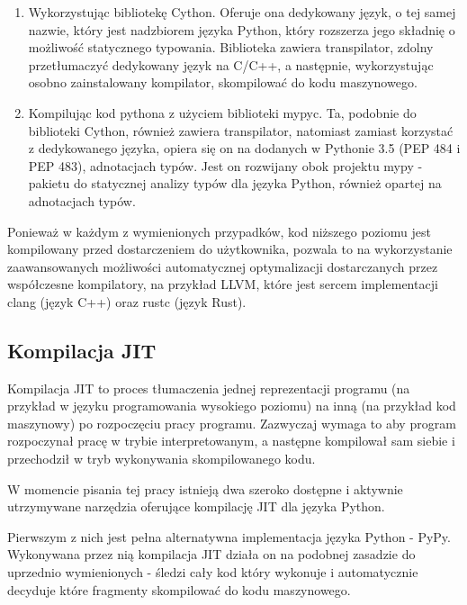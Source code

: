 \documentclass[11pt, a4paper]{article}
\begin{document}
\begin{sloppypar}
\begin{enumerate}
      \item Wykorzystując bibliotekę Cython\cite{Cython_Org}\cite{Cython_The_Best_Of_Both}.
        Oferuje ona dedykowany język, o tej samej nazwie, który jest nadzbiorem języka
        Python, który rozszerza jego składnię o możliwość statycznego typowania.
        Biblioteka zawiera transpilator, zdolny przetłumaczyć dedykowany język na C/C++,
        a następnie, wykorzystując osobno zainstalowany kompilator, skompilować do kodu
        maszynowego.

      \item Kompilując kod pythona z użyciem biblioteki mypyc\cite{mypyc}. Ta, podobnie
        do biblioteki Cython, również zawiera transpilator, natomiast zamiast korzystać
        z dedykowanego języka, opiera się on na dodanych w Pythonie 3.5\cite{Python_3_5}
        (PEP 484\cite{PEP_484} i PEP 483\cite{PEP_483}), adnotacjach typów. Jest on
        rozwijany obok projektu mypy - pakietu do statycznej analizy typów dla języka
        Python, również opartej na adnotacjach typów\cite{mypy}.
    \end{enumerate}

    Ponieważ w każdym z wymienionych przypadków, kod niższego poziomu jest kompilowany przed
    dostarczeniem do użytkownika, pozwala to na wykorzystanie zaawansowanych możliwości
    automatycznej optymalizacji dostarczanych przez współczesne kompilatory, na przykład
    LLVM, które jest sercem implementacji clang (język C++) oraz rustc (język Rust).

    \subsection{Kompilacja JIT}
    Kompilacja JIT to proces tłumaczenia jednej reprezentacji programu (na przykład w języku
    programowania wysokiego poziomu) na inną (na przykład kod maszynowy) po rozpoczęciu
    pracy programu. Zazwyczaj wymaga to aby program rozpoczynał pracę w trybie interpretowanym,
    a następne kompilował sam siebie i przechodził w tryb wykonywania skompilowanego
    kodu.

    W momencie pisania tej pracy istnieją dwa szeroko dostępne i aktywnie utrzymywane
    narzędzia oferujące kompilację JIT dla języka Python.

    Pierwszym z nich jest pełna alternatywna implementacja języka Python - PyPy\cite{PyPy_Home_Page}.
    Wykonywana przez nią kompilacja JIT działa on na podobnej zasadzie do uprzednio
    wymienionych - śledzi cały kod który wykonuje i automatycznie decyduje które
    fragmenty skompilować do kodu maszynowego\cite{PyPy_JIT}.


\end{sloppypar}
\end{document}

